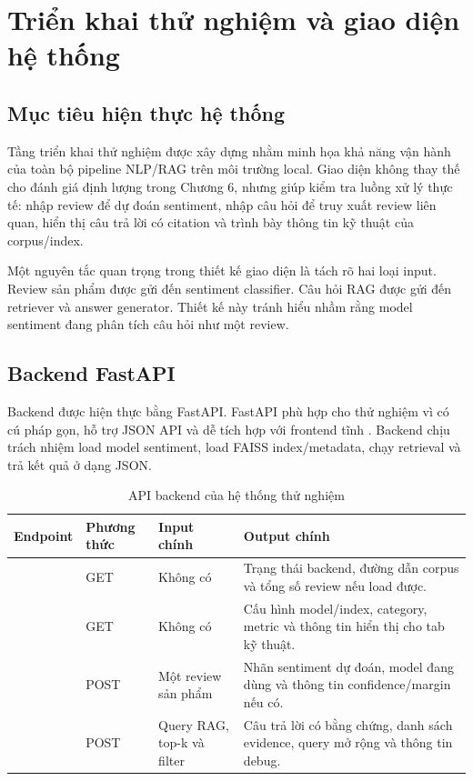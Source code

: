 \chapter{Triển khai thử nghiệm và giao diện hệ thống}

\section{Mục tiêu hiện thực hệ thống}
Tầng triển khai thử nghiệm được xây dựng nhằm minh họa khả năng vận hành của toàn bộ pipeline NLP/RAG trên môi trường local. Giao diện không thay thế cho đánh giá định lượng trong Chương 6, nhưng giúp kiểm tra luồng xử lý thực tế: nhập review để dự đoán sentiment, nhập câu hỏi để truy xuất review liên quan, hiển thị câu trả lời có citation và trình bày thông tin kỹ thuật của corpus/index.

Một nguyên tắc quan trọng trong thiết kế giao diện là tách rõ hai loại input. Review sản phẩm được gửi đến sentiment classifier. Câu hỏi RAG được gửi đến retriever và answer generator. Thiết kế này tránh hiểu nhầm rằng model sentiment đang phân tích câu hỏi như một review.

\section{Backend FastAPI}
Backend được hiện thực bằng FastAPI. FastAPI phù hợp cho thử nghiệm vì có cú pháp gọn, hỗ trợ JSON API và dễ tích hợp với frontend tĩnh \cite{fastapi}. Backend chịu trách nhiệm load model sentiment, load FAISS index/metadata, chạy retrieval và trả kết quả ở dạng JSON.

\begingroup
\small
\begin{longtable}{L{0.22\textwidth}L{0.16\textwidth}L{0.24\textwidth}L{0.28\textwidth}}
\caption{API backend của hệ thống thử nghiệm}\label{tab:backend-api}\\
\toprule
Endpoint & Phương thức & Input chính & Output chính \\
\midrule
{} & GET & Không có & Trạng thái backend, đường dẫn corpus và tổng số review nếu load được. \\
 & GET & Không có & Cấu hình model/index, category, metric và thông tin hiển thị cho tab kỹ thuật. \\
 & POST & Một review sản phẩm & Nhãn sentiment dự đoán, model đang dùng và thông tin confidence/margin nếu có. \\
 & POST & Query RAG, top-k và filter & Câu trả lời có bằng chứng, danh sách evidence, query mở rộng và thông tin debug. \\
\bottomrule
\end{longtable}
\endgroup


